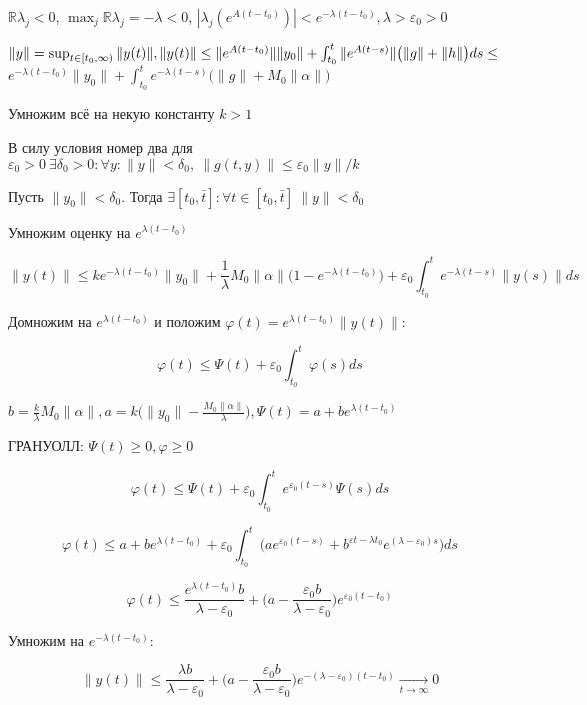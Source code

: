 \documentclass[12pt, a4paper]{article}
\begin{document}
  $\mathbb{R}\lambda_j < 0$, $\max_j \mathbb{R}\lambda_j = - \lambda < 0$, $| \lambda_j(e^{A(t-t_0)}) | < e^{-\lambda(t-t_0)}, \lambda > \varepsilon_0 > 0$

  $\| y \| = \sup_{t\in[t_0, \infty)} \| y(t) \|,\\ \|y(t)\| \le \| e^{A(t-t_0)} \| \| y_0\| + \int^t_{t_0} \| e^{A(t-s)}\| \big(\|g\| + \|h\|\big)ds \le $
  $e^{-\lambda(t-t_0)}\|y_0\| + \int^t_{t_0} e^{-\lambda(t-s)}\big(\|g\| + M_0\|\alpha\|\big)$

  Умножим всё на некую константу $k>1$

  В силу условия номер два для $\varepsilon_0 > 0 \ \exists \delta_0 > 0: \forall y: \| y \| < \delta_0, \ \| g(t,y) \| \le \varepsilon_0 \| y\| / k$

  Пусть $\| y_0 \| < \delta_0$. Тогда $\exists [t_0, \bar t]: \forall t \in [t_0, \bar t] \ \| y \| < \delta_0$

  Умножим оценку на $e^{\lambda(t-t_0)}$
 
  $$\| y(t) \| \le k e^{-\lambda(t-t_0)}\|y_0\| + \frac{1}{\lambda} M_0 \| \alpha \| \big(1 - e^{-\lambda(t-t_0)} \big) + \varepsilon_0\int^t_{t_0} e^{-\lambda(t-s)}\|y(s)\| ds$$

  Домножим на $e^{\lambda(t-t_0)}$ и положим $\varphi(t) = e^{\lambda(t-t_0)}\|y(t)\|$:

  $$\varphi(t) \le \Psi(t) +  \varepsilon_0 \int^t_{t_0}\varphi(s)ds $$

  $b = \frac{k}{\lambda}M_0\|\alpha\|, a = k \Big(\| y_0 \| - \frac{M_0 \|\alpha\|}{\lambda}\Big), \Psi(t) = a + be^{\lambda(t-t_0)}$

  ГРАНУОЛЛ: $\Psi(t) \ge 0, \varphi \ge 0$

  $$\varphi(t) \le \Psi(t) + \varepsilon_0 \int^t_{t_0} e^{\varepsilon_0(t-s)}\Psi(s)ds$$

  $$\varphi(t) \le  a + be^{\lambda(t-t_0)} + \varepsilon_0 \int^t_{t_0} \big( a e^{\varepsilon_0 (t-s)} + b^{\varepsilon t - \lambda t_0} e^{(\lambda - \varepsilon_0)s}\big) ds$$

  $$\varphi(t) \le \frac{e^{\lambda(t-t_0)}b}{\lambda - \varepsilon_0} + \Big(a - \frac{\varepsilon_0b}{\lambda - \varepsilon_0}\Big) e^{\varepsilon_0(t-t_0)}$$

  Умножим на $e^{-\lambda(t-t_0)}$:

  $$\|y(t)\| \le \frac{\lambda b}{\lambda - \varepsilon_0} + \Big(a - \frac{\varepsilon_0 b}{\lambda - \varepsilon_0}\Big) e^{-(\lambda - \varepsilon_0)(t-t_0)} \underset{t\to\infty}{\longrightarrow} 0$$
\end{document}
